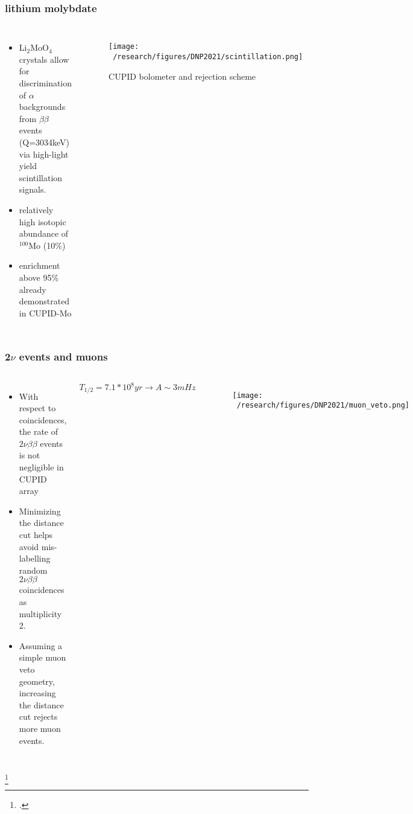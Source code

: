 \documentclass{beamer}
\begin{document}

	\begin{frame}
		\frametitle{lithium molybdate}
		\begin{columns}[c] %
			
			\begin{itemize}
				\item Li$_2$MoO$_4$ crystals allow for discrimination of $\alpha$ backgrounds from $\beta\beta$ events (Q=3034keV) via high-light yield scintillation signals.
				\item relatively high isotopic abundance of $^{100}$Mo (10\%)
				\item enrichment above 95\% already demonstrated in CUPID-Mo \cite{}
			\end{itemize}
			
			\begin{figure}
			\texttt{[image: ~/research/figures/DNP2021/scintillation.png]}
			\caption{CUPID bolometer and rejection scheme}
			\end{figure}
		\end{columns}
	\end{frame}

	

	\begin{frame}
		\frametitle{2$\nu$ events and muons}
		\begin{columns}[c] %
			
			\begin{itemize}
				\item With respect to coincidences, the rate of $2\nu\beta\beta$ events is not negligible in CUPID array\footnotemark
				\item Minimizing the distance cut helps avoid mis-labelling random $2\nu\beta\beta$ coincidences as multiplicity 2.
				\item Assuming a simple muon veto geometry, increasing the distance cut rejects more muon events.
			\end{itemize}
			
			$T_{1/2} = 7.1* 10^8 yr \rightarrow A \sim 3mHz$
			\begin{figure}
			\texttt{[image: ~/research/figures/DNP2021/muon\_veto.png]}
			\end{figure}
			
		\end{columns}
		\footcitetext{chernyak}
	\end{frame}
\end{document}
